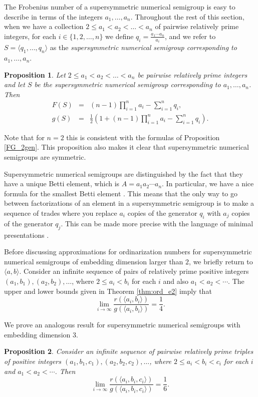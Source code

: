 \documentclass[12pt]{amsart}
\theoremstyle{plain}\newtheorem{proposition}{Proposition}[section]
\newtheorem{prop}[proposition]{Proposition}
\begin{document}
The Frobenius number of  a supersymmetric numerical semigroup is easy to describe in terms of the integers $a_1,\ldots, a_n$.  Throughout the rest of this section, when we have a collection $2\le a_1 < a_2 < \ldots < a_n$ of pairwise relatively prime integers, for each $i \in \{1,2,\ldots, n\}$ we define $q_i = \frac{a_1 \cdots a_n}{a_i}$, and we refer to $S = \langle q_1,\ldots, q_n\rangle$ as the \emph{supersymmetric numerical semigroup corresponding to $a_1,\ldots, a_n$}. 
\begin{prop}\cite{StronglyFlat}\label{Prop_genus_super}
Let $2\le a_1 < a_2 < \ldots < a_n$ be pairwise relatively prime integers and let $S$ be the supersymmetric numerical semigroup corresponding to $a_1,\ldots, a_n$.  Then
\begin{eqnarray*}
F(S) & = & (n-1)\prod\limits_{i=1}^{n}a_i-\sum\limits_{i=1}^n q_i, \\
g(S) & = & \frac{1}{2}\left(1+(n-1)\prod\limits_{i=1}^{n}a_i-\sum\limits_{i=1}^n q_i\right).
\end{eqnarray*}
\end{prop}
\noindent Note that for $n=2$ this is consistent with the formulas of Proposition \ref{FG_2gen}.  This proposition also makes it clear that supersymmetric numerical semigroups are symmetric.

Supersymmetric numerical semigroups are distinguished by the fact that they have a unique Betti element, which is $A = a_1 a_2\cdots a_n$. In particular, we have a nice formula for the smallest Betti element \cite[Example 12]{GSOR}.  This means that the only way to go between factorizations of an element in a supersymmetric semigroup is to make a sequence of trades where you replace $a_i$ copies of the generator $q_i$ with  $a_j$ copies of the generator $q_j$.  This can be made more precise with the language of minimal presentations \cite[Chapter 7]{GarciaSanchez_Rosales}.

Before discussing approximations for ordinarization numbers for supersymmetric numerical semigroups of embedding dimension larger than $2$, we briefly return to $\langle a,b \rangle$.  Consider an infinite sequence of pairs of relatively prime positive integers $(a_1,b_1), (a_2,b_2),\ldots$, where $2\le a_i < b_i$ for each $i$ and also $a_1 < a_2 < \cdots$.  The upper and lower bounds given in Theorem \ref{thm:ord_e2} imply that 
\[
\lim_{i\rightarrow \infty} \frac{r(\langle a_i, b_i \rangle)}{g(\langle a_i, b_i \rangle)} = \frac{1}{4}.
\]

We prove an analogous result for supersymmetric numerical semigroups with embedding dimension $3$.
\begin{prop}
Consider an infinite sequence of pairwise relatively prime triples of positive integers $(a_1,b_1,c_1), (a_2,b_2,c_2),\ldots$, where $2\le a_i < b_i<c_i$ for each $i$ and $a_1 < a_2 < \cdots$. Then 
\[
\lim_{i \rightarrow \infty} \frac{r(\langle a_i, b_i, c_i\rangle)}{g(\langle a_i, b_i, c_i\rangle)} = \frac{1}{6}.
\]
\end{prop}
\end{document}
